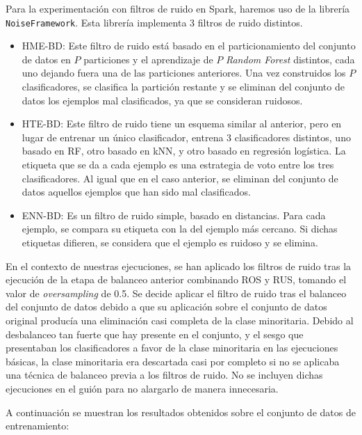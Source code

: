 \documentclass[
  a4paper,
,tablecaptionabove
]{scrartcl}
\providecommand{\tightlist}{%
  \setlength{\itemsep}{0pt}\setlength{\parskip}{0pt}}
\begin{document}
Para la experimentación con filtros de ruido en Spark, haremos uso de la
librería \texttt{NoiseFramework}. Esta librería implementa 3 filtros de
ruido distintos.

\begin{itemize}
\tightlist
\item
  HME-BD: Este filtro de ruido está basado en el particionamiento del
  conjunto de datos en \(P\) particiones y el aprendizaje de \(P\)
  \emph{Random Forest} distintos, cada uno dejando fuera una de las
  particiones anteriores. Una vez construidos los \(P\) clasificadores,
  se clasifica la partición restante y se eliminan del conjunto de datos
  los ejemplos mal clasificados, ya que se consideran ruidosos.
\item
  HTE-BD: Este filtro de ruido tiene un esquema similar al anterior,
  pero en lugar de entrenar un único clasificador, entrena 3
  clasificadores distintos, uno basado en RF, otro basado en kNN, y otro
  basado en regresión logística. La etiqueta que se da a cada ejemplo es
  una estrategia de voto entre los tres clasificadores. Al igual que en
  el caso anterior, se eliminan del conjunto de datos aquellos ejemplos
  que han sido mal clasificados.
\item
  ENN-BD: Es un filtro de ruido simple, basado en distancias. Para cada
  ejemplo, se compara su etiqueta con la del ejemplo más cercano. Si
  dichas etiquetas difieren, se considera que el ejemplo es ruidoso y se
  elimina.
\end{itemize}

En el contexto de nuestras ejecuciones, se han aplicado los filtros de
ruido tras la ejecución de la etapa de balanceo anterior combinando ROS
y RUS, tomando el valor de \emph{oversampling} de 0.5. Se decide aplicar
el filtro de ruido tras el balanceo del conjunto de datos debido a que
su aplicación sobre el conjunto de datos original producía una
eliminación casi completa de la clase minoritaria. Debido al desbalanceo
tan fuerte que hay presente en el conjunto, y el sesgo que presentaban
los clasificadores a favor de la clase minoritaria en las ejecuciones
básicas, la clase minoritaria era descartada casi por completo si no se
aplicaba una técnica de balanceo previa a los filtros de ruido. No se
incluyen dichas ejecuciones en el guión para no alargarlo de manera
innecesaria.

A continuación se muestran los resultados obtenidos sobre el conjunto de
datos de entrenamiento:
\end{document}
